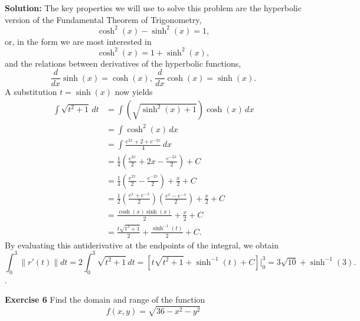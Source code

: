 \documentclass[12pt,oneside]{exam}
\newenvironment{exercise}[1]{\vspace{.1in}\noindent\textbf{Exercise #1 \hspace{.05em}}}{}
\newenvironment{newsolution}{\vspace{.1in}\noindent\textbf{Solution: \hspace{.05em}}}{}
\begin{document}
\begin{newsolution}
The key properties we will use to solve this problem are the hyperbolic version of the Fundamental Theorem of Trigonometry, 
\begin{equation*}
\cosh^2(x)-\sinh^2(x) = 1,
\end{equation*}
or, in the form we are most interested in
\begin{equation*}
\cosh^2(x) = 1 + \sinh^2(x),
\end{equation*}
and the relations between derivatives of the hyperbolic functions, 
\begin{equation*}
\frac{d}{dx}\sinh(x) = \cosh(x), \, \frac{d}{dx}\cosh(x) = \sinh(x).
\end{equation*}
A substitution $t = \sinh(x)$ now yields
\begin{align*}
\int \sqrt{t^2+1} \, dt & = \int \left(\sqrt{\sinh^2(x)+1}\right)\cosh(x) \, dx \\
& = \int \cosh^2(x) \, dx \\
& = \int \frac{e^{2x}+2+e^{-2x}}{4} \, dx \\
& = \frac{1}{4} \left( \frac{e^{2x}}{2}+2x -\frac{e^{-2x}}{2} \right) + C \\
& = \frac{1}{4}\left( \frac{e^{2x}}{2}-\frac{e^{-2x}}{2} \right) + \frac{x}{2}  + C\\
& = \frac{1}{2}\left( \frac{e^{x}+e^{-x}}{2}\right)\left(\frac{e^{x}-e^{-x}}{2} \right) + \frac{x}{2}+C\\
& = \frac{\cosh(x)\sinh(x)}{2}+\frac{x}{2}+C\\
& = \frac{t\sqrt{t^2+1}}{2} + \frac{\sinh^{-1}(t)}{2} + C.
\end{align*}
By evaluating this antiderivative at the endpoints of the integral, we obtain
\begin{equation*}
\int_{0}^{3} \| r'(t)\| dt = 2\int_{0}^{3} \sqrt{t^2+1} \, dt = \left[ t\sqrt{t^2+1}+ \sinh^{-1}(t) + C \right] \Big|_{0}^{3} =  3 \sqrt{10}+\sinh ^{-1}(3).
\end{equation*}
\end{newsolution}. 

\begin{exercise}{6}
Find the domain and range of the function
\begin{equation*}
f(x,y) = \sqrt{36 - x^2-y^2}
\end{equation*}
\end{exercise}
\end{document}
